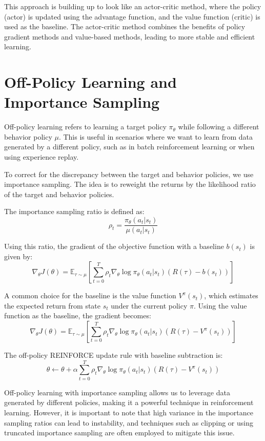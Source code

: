\documentclass[12pt]{article}
\begin{document}
This approach is building up to look like an actor-critic method, where the policy (actor) is updated using the advantage function, and the value function (critic) is used as the baseline. The actor-critic method combines the benefits of policy gradient methods and value-based methods, leading to more stable and efficient learning.

\section{Off-Policy Learning and Importance Sampling}

Off-policy learning refers to learning a target policy \( \pi_\theta \) while following a different behavior policy \( \mu \). This is useful in scenarios where we want to learn from data generated by a different policy, such as in batch reinforcement learning or when using experience replay.

To correct for the discrepancy between the target and behavior policies, we use importance sampling. The idea is to reweight the returns by the likelihood ratio of the target and behavior policies.

The importance sampling ratio is defined as:
\[ 
\rho_t = \frac{\pi_\theta(a_t | s_t)}{\mu(a_t | s_t)} 
\]

Using this ratio, the gradient of the objective function with a baseline \( b(s_t) \) is given by:
\[ 
\nabla_\theta J(\theta) = \mathbb{E}_{\tau \sim \mu} \left[ \sum_{t=0}^{T} \rho_t \nabla_\theta \log \pi_\theta(a_t | s_t) (R(\tau) - b(s_t)) \right] 
\]

A common choice for the baseline is the value function \( V^\pi(s_t) \), which estimates the expected return from state \( s_t \) under the current policy \( \pi \). Using the value function as the baseline, the gradient becomes:
\[ 
\nabla_\theta J(\theta) = \mathbb{E}_{\tau \sim \mu} \left[ \sum_{t=0}^{T} \rho_t \nabla_\theta \log \pi_\theta(a_t | s_t) (R(\tau) - V^\pi(s_t)) \right] 
\]

The off-policy REINFORCE update rule with baseline subtraction is:
\[ 
\theta \leftarrow \theta + \alpha \sum_{t=0}^{T} \rho_t \nabla_\theta \log \pi_\theta(a_t | s_t) (R(\tau) - V^\pi(s_t)) 
\]

Off-policy learning with importance sampling allows us to leverage data generated by different policies, making it a powerful technique in reinforcement learning. However, it is important to note that high variance in the importance sampling ratios can lead to instability, and techniques such as clipping or using truncated importance sampling are often employed to mitigate this issue.
\end{document}

